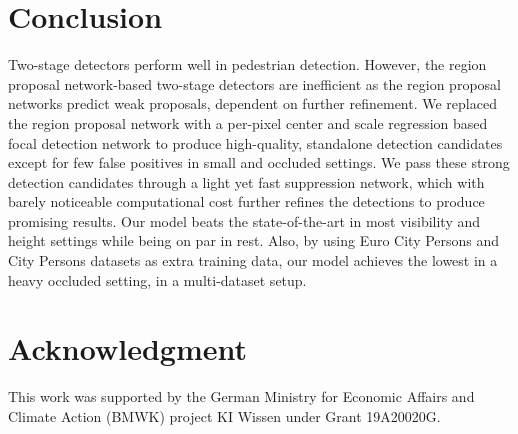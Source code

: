 \documentclass[a4paper,conference]{IEEEtran}
\begin{document}
\section{Conclusion}
Two-stage detectors perform well in pedestrian detection. However, the region proposal network-based two-stage detectors are inefficient as the region proposal networks predict weak proposals, dependent on further refinement. We replaced the region proposal network with a per-pixel center and scale regression based focal detection network to produce high-quality, standalone detection candidates except for few false positives in small and occluded settings. We pass these strong detection candidates through a light yet fast suppression network, which with barely noticeable computational cost further refines the detections to produce promising results. Our model beats the state-of-the-art in most visibility and height settings while being on par in rest. Also, by using Euro City Persons \cite{eurocitypersons} and City Persons \cite{citypersons} datasets as extra training data, our model achieves the lowest  in a heavy occluded setting, in a multi-dataset setup. 






\section*{Acknowledgment}
This work was supported by the German Ministry for Economic Affairs and Climate Action (BMWK) project KI Wissen under Grant 19A20020G.













\end{document}
